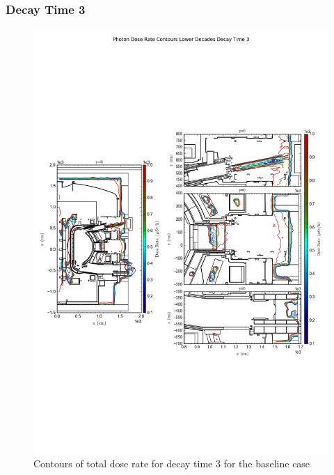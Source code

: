 \documentclass[12pt]{article}
\begin{document}
\subsubsection*{Decay Time 3}
\begin{figure}[ht!]
\centering
\includegraphics[trim={0cm 8cm, 0cm 8cm},clip,scale=0.75]{../plots/final_model/Photon_Dose_Rate_Contours_Lower_Decades_Decay_Time_3.png}
\caption{Contours of total dose rate for decay time 3 for the baseline case}
\label{fig:photons_dc3_nob4c_contours_l}
\end{figure}
\end{document}
